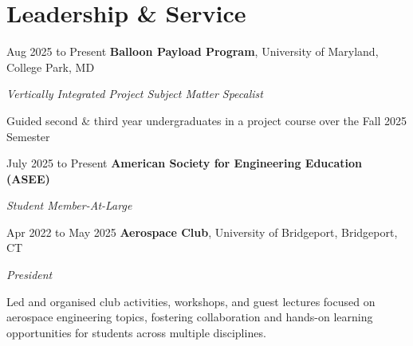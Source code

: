 \section{Leadership \& Service}
	\begin{twocolentry}{Aug 2025 to Present}
        \textbf{Balloon Payload Program}, University of Maryland, College Park, MD
    \end{twocolentry}
    \textit{Vertically Integrated Project Subject Matter Specalist}
    \vspace{0.10 cm}
    \begin{onecolentry}
        \begin{highlights}
            \item Guided second \& third year undergraduates in a project course over the Fall 2025 Semester
        \end{highlights}           
    \end{onecolentry}

    \vspace{0.10 cm}
    
	\begin{twocolentry}{July 2025 to Present}
        \textbf{American Society for Engineering Education (ASEE)}
    \end{twocolentry}
    \textit{Student Member-At-Large}
    \vspace{0.10 cm}

        
    \begin{twocolentry}{Apr 2022 to May 2025}
        \textbf{Aerospace Club}, University of Bridgeport, Bridgeport, CT
    \end{twocolentry}
    \textit{President}
    \vspace{0.10 cm}
    \begin{onecolentry}
        \begin{highlights}
            \item Led and organised club activities, workshops, and guest lectures focused on aerospace engineering topics, fostering collaboration and hands-on learning opportunities for students across multiple disciplines.
        \end{highlights}
    \end{onecolentry}

